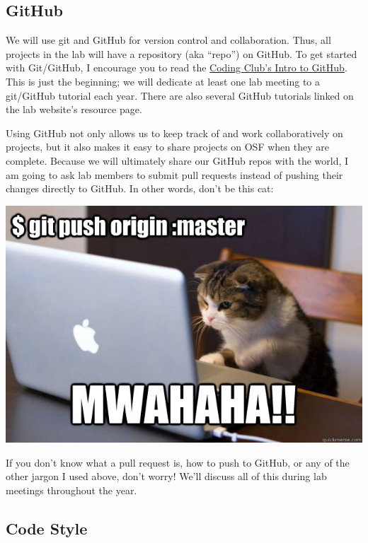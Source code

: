 \documentclass[]{book}
\begin{document}
\hypertarget{github}{%
\subsection{GitHub}\label{github}}

We will use git and GitHub for version control and collaboration. Thus, all projects in the lab will have a repository (aka ``repo'') on GitHub. To get started with Git/GitHub, I encourage you to read the \href{https://ourcodingclub.github.io/2017/02/27/git.html}{Coding Club's Intro to GitHub}. This is just the beginning; we will dedicate at least one lab meeting to a git/GitHub tutorial each year. There are also several GitHub tutorials linked on the lab website's resource page.

Using GitHub not only allows us to keep track of and work collaboratively on projects, but it also makes it easy to share projects on OSF when they are complete. Because we will ultimately share our GitHub repos with the world, I am going to ask lab members to submit pull requests instead of pushing their changes directly to GitHub. In other words, don't be this cat:

\includegraphics{images/github.png}

If you don't know what a pull request is, how to push to GitHub, or any of the other jargon I used above, don't worry! We'll discuss all of this during lab meetings throughout the year.

\hypertarget{code-style}{%
\subsection{Code Style}\label{code-style}}
\end{document}
